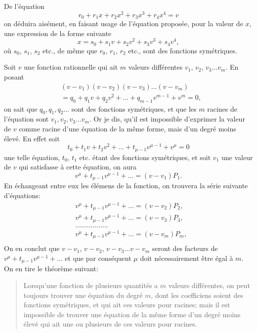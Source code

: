 \documentclass[oneside, 12 pt, leqno]{memoir}
\begin{document}
De l'équation
\[r_0+r_1 x+r_2 x^2+r_3 x^3+r_4 x^4=v\]
on déduira aisément, en faisant usage de l'équation proposée, pour la valeur de \(x\), une expression de la forme suivante
\[x=s_0+s_1 v+s_2 v^2+s_3 v^3+s_4 v^4,\]
où \(s_0\), \(s_1\), \(s_2\) etc., de même que \(r_0\), \(r_1\), \(r_2\) etc., sont des fonctions symétriques.

Soit \(v\) une fonction rationnelle qui ait \(m\) valeurs différentes \(v_1\), \(v_2\), \(v_3 \dots v_m\). En posant
\[\begin{aligned}
& \left(v-v_1\right)\left(v-v_2\right)\left(v-v_3\right) \dots\left(v-v_m\right) \\
& =q_0+q_1 v+q_2 v^2+\dots+q_{m-1} v^{m-1}+v^m=0,
\end{aligned}\]
on sait que \(q_0, q_1, q_2 \dots\) sont des fonctions symétriques, et que les \(m\) racines de l'équation sont \(v_1, v_2, v_3 \dots v_m\). Or je dis, qu'il est impossible d'exprimer la valeur de \(v\) comme racine d'une équation de la même forme, mais d'un degré moins élevé. En effet soit
\[t_0+t_1 v+t_2 v^2+\dots+t_{\mu-1} v^{\mu-1}+v^\mu=0\]
une telle équation, \(t_0\), \(t_1\) etc. étant des fonctions symétriques, et soit \(v_1\) une valeur de \(v\) qui satisfasse à cette équation, on aura
\[v^\mu+t_{\mu-1} v^{\mu-1}+\dots=\left(v-v_1\right) P_1.\]
En échangeant entre eux les élémens de la fonction, on trouvera la série suivante d'équations:
\[\begin{aligned}
& v^\mu+t_{\mu-1} v^{\mu-1}+\dots=\left(v-v_2\right) P_2, \\
& v^\mu+t_{\mu-1} v^{\mu-1}+\dots=\left(v-v_3\right) P_3, \\
& \dots \dots \dots. \dots. \dots \\
& v^\mu+t_{\mu-1} v^{\mu-1}+\dots=\left(v-v_m\right) P_m, \\
\end{aligned}\] 
On en conclut que \(v-v_1\), \(v-v_2\), \(v-v_3 \dots v-v_m\) seront des facteurs de \(v^\mu+t_{\mu-1} v^{\mu-1}+\dots\) et que par conséquent \(\mu\) doit nécessairement être égal à \(m\). On en tire le théorème suivant:
\begin{quote}Lorsqu'une fonction de plusieurs quantités a \(m\) valeurs différentes, on peut toujours trouver une équation du degré \(m\), dont les coefficiens soient des fonctions symétriques, et qui ait ces valeurs pour racines; mais il est impossible de trouver une équation de la même forme d'un degré moins élevé qui ait une ou plusieurs de ces valeurs pour racines.\end{quote}
\end{document}
